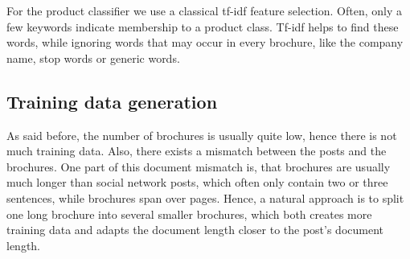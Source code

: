 For the product classifier we use a classical tf-idf\cite{sparck1972statistical} feature selection.
Often, only a few keywords indicate membership to a product class.
Tf-idf helps to find these words, while ignoring words that may occur in every brochure, like the company name, stop words or generic words.


\subsection{Training data generation}

As said before, the number of brochures is usually quite low, hence there is not much training data.
Also, there exists a mismatch between the posts and the brochures.
One part of this document mismatch is, that brochures are usually much longer than social network posts, which often only contain two or three sentences, while brochures span over pages.
Hence, a natural approach is to split one long brochure into several smaller brochures, which both creates more training data and adapts the document length closer to the post's document length.
